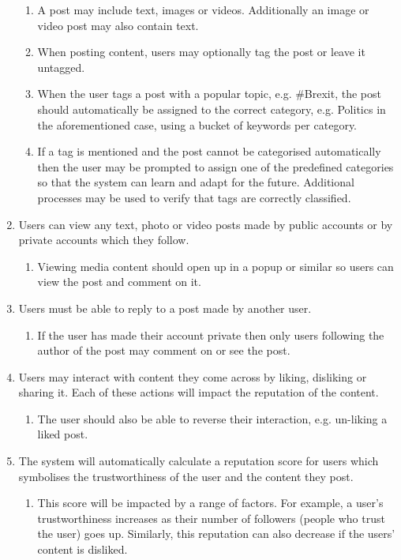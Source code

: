 \begin{enumerate}[label=\textbf{F\arabic*}]
\begin{enumerate}
			\item A post may include text, images or videos. Additionally an image or video post may also contain text.
			\item When posting content, users may optionally tag the post or leave it untagged.
			\item When the user tags a post with a popular topic, e.g. \#Brexit, the post should automatically be assigned to the correct category, e.g. Politics in the aforementioned case, using a bucket of keywords per category.
			\item If a tag is mentioned and the post cannot be categorised automatically then the user may be prompted to assign one of the predefined categories so that the system can learn and adapt for the future. Additional processes may be used to verify that tags are correctly classified.
		\end{enumerate}
	\item Users can view any text, photo or video posts made by public accounts or by private accounts which they follow.
		\begin{enumerate}
			\item Viewing media content should open up in a popup or similar so users can view the post and comment on it.
		\end{enumerate}
	\item Users must be able to reply to a post made by another user.
		\begin{enumerate}
			\item If the user has made their account private then only users following the author of the post may comment on or see the post.
		\end{enumerate}
	\item Users may interact with content they come across by liking, disliking or sharing it. Each of these actions will impact the reputation of the content.
		\begin{enumerate}
			\item The user should also be able to reverse their interaction, e.g. un-liking a liked post.
		\end{enumerate}
	\item The system will automatically calculate a reputation score for users which symbolises the trustworthiness of the user and the content they post.
		\begin{enumerate}
			\item This score will be impacted by a range of factors. For example, a user's trustworthiness increases as their number of followers (people who trust the user) goes up. Similarly, this reputation can also decrease if the users' content is disliked.

\end{enumerate}
\end{enumerate}
